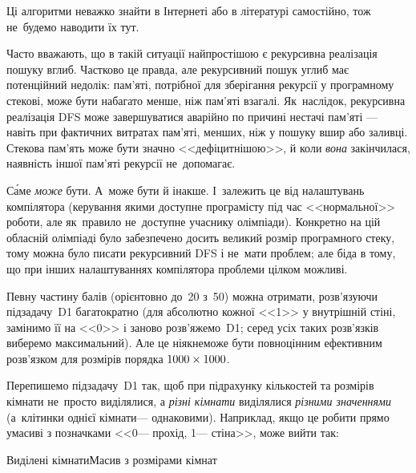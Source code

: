\documentclass[14pt,a4paper]{extarticle}
\begin{document}
Ці алгоритми неважко знайти в Інтернеті або в літературі самостійно, тож не~будемо наводити їх тут.

\myhrulefill

Часто вважають, що в такій ситуації найпростішою є рекурсивна реалізація пошуку вглиб. Частково це правда, але рекурсивний пошук углиб має потенційний недолік: пам'яті, потрібної для зберігання рекурсії у програмному стекові, може бути набагато менше, ніж пам'яті взагалі. Як~наслідок, рекурсивна реалізація DFS може завершуватися аварійно по причині \mbox{нестачі} пам'яті --- навіть при фактичних витратах пам'яті, менших, ніж у пошуку вшир або заливці. Стекова пам'ять може бути значно <<дефіцитнішою>>, й коли \emph{вона} закінчилася, наявність іншої пам'яті рекурсії не~допомагає.

С\'{а}ме \emph{може} бути. А~може бути й інакше. І~залежить це від налаштувань компілятора (керування якими доступне програмісту під час <<нормальної>> роботи, але як~правило не~доступне учаснику олімпіади). Конкретно на цій обласній олімпіаді було забезпечено досить великий розмір програмного стеку, тому можна було писати рекурсивний DFS і не~мати проблем; але біда в тому, що при інших налаштуваннях компілятора проблеми цілком можливі.







Певну частину балів (орієнтовно до~20 з~50) можна отримати, розв’язуючи підзадачу~D1 багатократно (для абсолютно кожної <<1>> у внутрішній стіні, замінимо її на <<0>> і заново розв’яжемо~D1; серед усіх таких розв’язків виберемо максимальний). Але це ніяк\nolinebreak[2] не\nolinebreak[3] може бути повноцінним ефективним розв’язком для розмірів порядка $1000\times1000$.

Перепишемо підзадачу~D1 так, щоб при підрахунку кількостей та розмірів кімнати не~просто виділялися, а \emph{різні кімнати} виділялися \emph{різними значеннями} (а~клітинки однієї кімнати\nolinebreak[3] --- однаковими). Наприклад, якщо це робити прямо у\nolinebreak[3] масиві з позначками <<0\nolinebreak[3] --- прохід, 1\nolinebreak[3] --- стіна>>, може вийти так:

\noindent\begin{minipage}{\textwidth}
\begin{exampleSimpleThreeWithSpecNameColTwo}{6em}{12em}{13em}{Виділені кімнати}{Масив з розмірами кімнат}%
%
\end{exampleSimpleThreeWithSpecNameColTwo}
\end{minipage}
\end{document}
